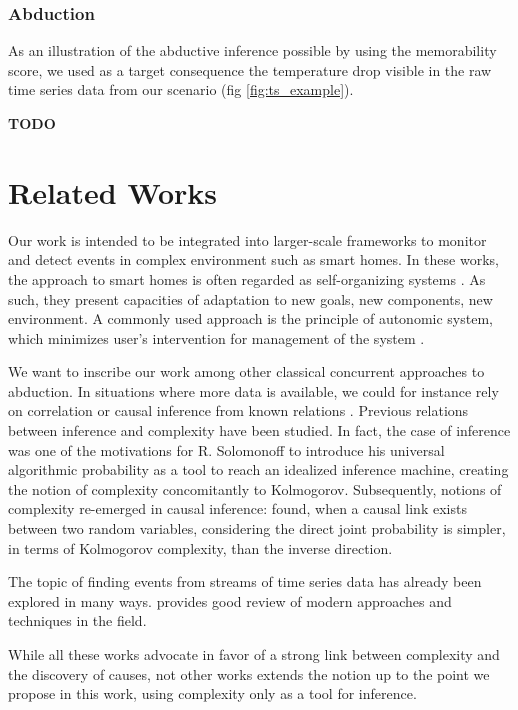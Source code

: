 \documentclass[conference]{IEEEtran}
\begin{document}
\subsubsection{Abduction}

As an illustration of the abductive inference possible by using the memorability
score, we used as a target consequence the temperature drop visible in the raw
time series data from our scenario (fig \ref{fig:ts_example}).

\textbf{TODO}

\section{Related Works}
\label{sec:related}
Our work is intended to be integrated into larger-scale frameworks to monitor 
and detect events in complex environment such as smart homes. In these works, the
approach to smart homes is often regarded as self-organizing systems \cite{kramer_rigorous_2009,kounev_notion_2017}. As such, they present capacities of adaptation to new goals, 
new components, new environment. A commonly used approach is the principle of 
autonomic system, which minimizes user's intervention for management of the 
system \cite{kounev_notion_2017,kephart_vision_2003}.

We want to inscribe our work among other classical concurrent approaches to 
abduction. In situations where more data is available, we could for instance rely
on correlation or causal inference from known relations \cite{peters_elements_2017,fadiga_or_2021}.
Previous relations between inference and complexity have been studied. In fact, the 
case of inference was one of the motivations for R. Solomonoff to introduce his 
universal algorithmic probability \cite{solomonoff_formal_1964} as a tool to 
reach an idealized inference machine, creating the notion of complexity concomitantly 
to Kolmogorov. Subsequently, notions of complexity re-emerged in causal inference: 
\cite{janzing_causal_2010} found, when a causal link exists between two random variables,
considering the direct joint probability is simpler, in terms of Kolmogorov complexity, 
than the inverse direction.

The topic of finding events from streams of time series data has already been explored in many ways. 
\cite{aggarwal_outlier_2017} provides good review of modern approaches and techniques
in the field.

While all these works advocate in favor of a strong link between complexity and the 
discovery of causes, not other works extends the notion up to the point we propose in this
work, using complexity only as a tool for inference. 
\end{document}
